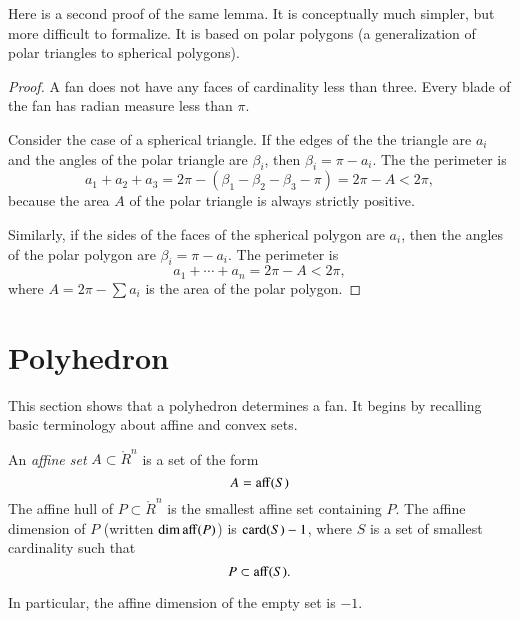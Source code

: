 Here is a second proof of the same lemma.  It is conceptually much simpler, but more difficult to formalize.  It is based on polar polygons (a generalization of polar triangles to spherical polygons).

\begin{proof} A fan does not have any faces of cardinality less than three.
Every blade of the fan has radian measure less than $\pi$.  

Consider the case of a spherical triangle.  If the edges of the
the triangle are $a_i$ and the angles of the polar
triangle are $\beta_i$, then $\beta_i=\pi-a_i$.
The the perimeter is 
$$a_1+a_2+a_3 = 2\pi - (\beta_1 -\beta_2 - \beta_3-\pi)= 2\pi-A < 2\pi,$$
because the area $A$ of the polar triangle is always strictly positive.

Similarly, if the sides of the faces of the spherical polygon are
$a_i$, then the angles of the polar polygon are $\beta_i = \pi-a_i$.
The perimeter is
$$
a_1+\cdots+a_n  = 2\pi- A< 2\pi,
$$
where $A = 2\pi-\sum a_i$ is the area of the polar polygon.
\end{proof}



\section{Polyhedron}

This section shows that a polyhedron determines a fan.  It begins by recalling basic terminology about affine and convex sets.

\begin{definition}
An  {\it affine set} $A\subset\ring{R}^n$ is a set of the form
$$
A={\operatorname{aff}}(S)
$$
The
affine hull of $P\subset\ring{R}^n$ is the smallest affine set containing $P$.  The affine dimension of $P$ (written $\operatorname{dim\,aff}(P)$) is ${\operatorname{card}}(S)-1$, where $S$ is a set of smallest cardinality such that
$$
P \subset {\operatorname{aff}}(S).
$$
\end{definition}
In particular, the affine dimension of the empty set is $-1$.

